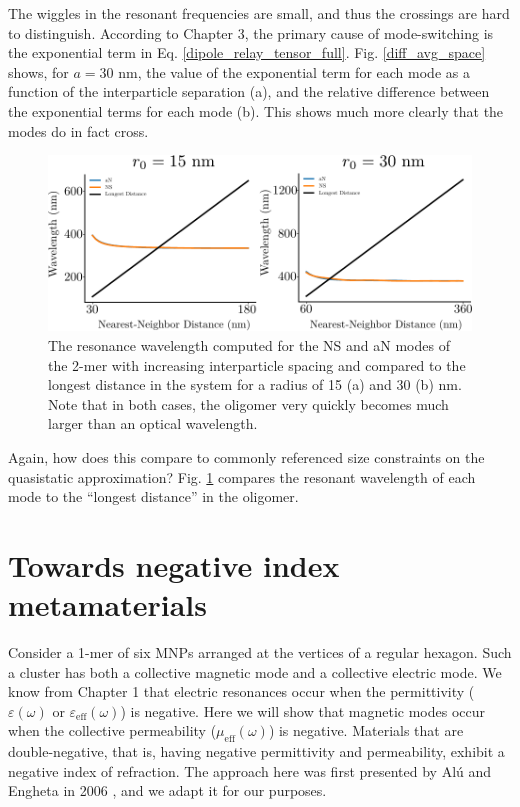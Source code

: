 \documentclass [11pt, proquest] {uwthesis}[2016/11/22]
\begin{document}
The wiggles in the resonant frequencies are small, and thus the crossings are hard to distinguish. According to Chapter 3, the primary cause of mode-switching is the exponential term in Eq. \ref{dipole_relay_tensor_full}. Fig. \ref{diff_avg_space} shows, for $a=30$ nm, the value of the exponential term for each mode as a function of the interparticle separation (a), and the relative difference between the exponential terms for each mode (b). This shows much more clearly that the modes do in fact cross.

\begin{figure}
\begin{centering}
\includegraphics{length_comp_sapcing.pdf}
\caption{The resonance wavelength computed for the NS and aN modes of the 2-mer with increasing interparticle spacing and compared to the longest distance in the system for a radius of 15 (a) and 30 (b) nm. Note that in both cases, the oligomer very quickly becomes much larger than an optical wavelength.}
\label{length_space}
\end{centering}
\end{figure}


Again, how does this compare to commonly referenced size constraints on the quasistatic approximation? Fig. \ref{length_space} compares the resonant wavelength of each mode to the ``longest distance'' in the oligomer.


\section{Towards negative index metamaterials}

Consider a 1-mer of six MNPs arranged at the vertices of a regular hexagon. Such a cluster has both a collective magnetic mode and a collective electric mode. We know from Chapter 1 that electric resonances occur when the permittivity ($\varepsilon(\omega)$ or $\varepsilon_{\textrm{eff}}(\omega)$) is negative. Here we will show that magnetic modes occur when the collective permeability ($\mu_{\textrm{eff}}(\omega)$) is negative. Materials that are double-negative, that is, having negative permittivity and permeability, exhibit a negative index of refraction. The approach here was first presented by Al\'{u} and Engheta in 2006 \cite{Alu2006}, and we adapt it for our purposes.
\end{document}
